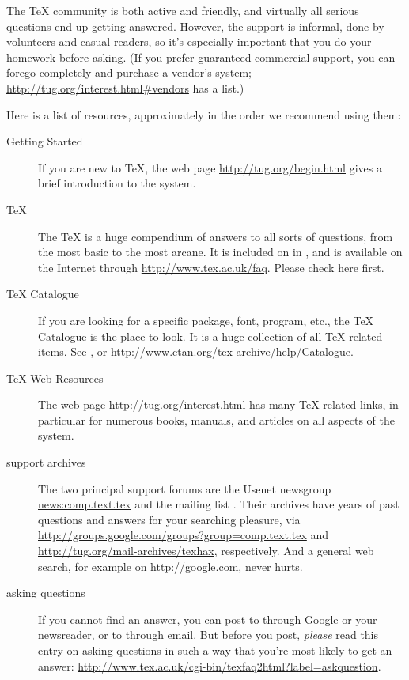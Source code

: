 \documentclass{article}
\begin{document}
The \TeX{} community is both active and friendly, and virtually all
serious questions end up getting answered.  However, the support is
informal, done by volunteers and casual readers, so it's especially
important that you do your homework before asking.  (If you prefer
guaranteed commercial support, you can forego \TL{} completely and
purchase a vendor's system; \url{http://tug.org/interest.html#vendors}
has a list.)

Here is a list of resources, approximately in the order we recommend
using them:

\begin{description}
\item [Getting Started] If you are new to \TeX, the web page
\url{http://tug.org/begin.html} gives a brief introduction to the system.

\item [\TeX{} ] The \TeX{}  is a huge compendium of
answers to all sorts of questions, from the most basic to the most
arcane.  It is included on \TL{} in , and is
available on the Internet through \url{http://www.tex.ac.uk/faq}.
Please check here first.

\item [\TeX{} Catalogue] If you are looking for a specific package,
font, program, etc., the \TeX{} Catalogue is the place to look.  It is a
huge collection of all \TeX{}-related items.  See
, or
\url{http://www.ctan.org/tex-archive/help/Catalogue}.

\item [\TeX{} Web Resources] The web page
\url{http://tug.org/interest.html} has many \TeX{}-related links, in
particular for numerous books, manuals, and articles on all aspects of
the system.

\item [support archives] The two principal support forums are the
Usenet newsgroup \url{news:comp.text.tex} and the mailing list
.  Their archives have years of past
questions and answers for your searching pleasure, via
\url{http://groups.google.com/groups?group=comp.text.tex} and
\url{http://tug.org/mail-archives/texhax}, respectively.  And a general web
search, for example on \url{http://google.com}, never hurts.

\item [asking questions] If you cannot find an answer, you can post to
 through Google or your newsreader, or to
 through email.  But before you post,
\emph{please} read this  entry on asking questions in such a
way that you're most likely to get an answer:
\url{http://www.tex.ac.uk/cgi-bin/texfaq2html?label=askquestion}.


\end{description}
\end{document}
